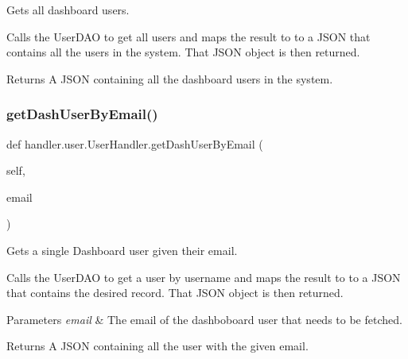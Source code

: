 Gets all dashboard users. 

Calls the User\+D\+AO to get all users and maps the result to to a J\+S\+ON that contains all the users in the system. That J\+S\+ON object is then returned.

\begin{DoxyReturn}{Returns}
A J\+S\+ON containing all the dashboard users in the system. 
\end{DoxyReturn}
\mbox{\label{classhandler_1_1user_1_1_user_handler_ae8de510893a8c86cc173b55739143368}} 
\subsubsection{\texorpdfstring{get\+Dash\+User\+By\+Email()}{getDashUserByEmail()}}
{\footnotesize\ttfamily def handler.\+user.\+User\+Handler.\+get\+Dash\+User\+By\+Email (\begin{DoxyParamCaption}\item[{}]{self,  }\item[{}]{email }\end{DoxyParamCaption})}



Gets a single Dashboard user given their email. 

Calls the User\+D\+AO to get a user by username and maps the result to to a J\+S\+ON that contains the desired record. That J\+S\+ON object is then returned.


\begin{DoxyParams}{Parameters}
{\em email} & The email of the dashboboard user that needs to be fetched.\\
\hline
\end{DoxyParams}
\begin{DoxyReturn}{Returns}
A J\+S\+ON containing all the user with the given email. 
\end{DoxyReturn}
\mbox{\label{classhandler_1_1user_1_1_user_handler_a8496fb014da7425079e6a2c02a5b6af6}} 
